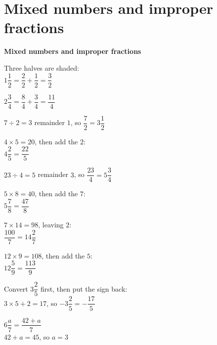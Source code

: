 \documentclass[aspectratio=169]{beamer}
\newcommand{\qtopic}[1]{%
  \section{#1}%
  \begin{frame}[plain]
    \vfill
    \begin{center}
      {\usebeamercolor[fg]{structure}\Huge\bfseries #1}
    \end{center}
    \vfill
  \end{frame}%
}
\begin{document}
\qtopic{Mixed numbers and improper fractions}

  {
   \par\vspace{0.6em}
   Three halves are shaded:\\[0.3em]
   $1\dfrac12=\dfrac{2}{2}+\dfrac{1}{2}=\dfrac{3}{2}$}

  {
   \par\vspace{0.6em}
   $2\dfrac34=\dfrac{8}{4}+\dfrac{3}{4}=\dfrac{11}{4}$}

  {
   \par\vspace{0.6em}
   $7\div 2=3$ remainder $1$, so $\dfrac72=3\dfrac12$}

  {$4\times 5=20$, then add the $2$:\\[0.4em]
   $4\dfrac25=\dfrac{22}{5}$}

  {
   \par\vspace{0.6em}
   $23\div 4=5$ remainder $3$, so $\dfrac{23}{4}=5\dfrac34$}

  {$5\times 8=40$, then add the $7$:\\[0.4em]
   $5\dfrac78=\dfrac{47}{8}$}

  {$7\times 14=98$, leaving $2$:\\[0.4em]
   $\dfrac{100}{7}=14\dfrac27$}

  {$12\times 9=108$, then add the $5$:\\[0.4em]
   $12\dfrac59=\dfrac{113}{9}$}

  {Convert $3\dfrac25$ first, then put the sign back:\\[0.4em]
   $3\times 5+2=17$, so $-3\dfrac25=-\dfrac{17}{5}$}

  {$6\dfrac{a}{7}=\dfrac{42+a}{7}$\\[0.4em]
   $42+a=45$, so $a=3$}
\end{document}
